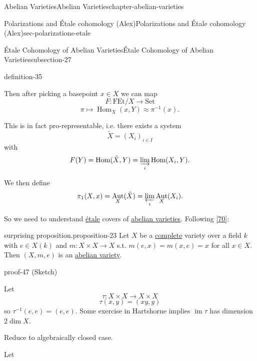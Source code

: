 \documentclass[oneside,10pt,]{book}
\numberwithin{equation}{section}
\DeclareMathOperator{\Hom}{Hom}
\DeclareMathOperator{\im}{im}
\DeclareMathOperator{\Aut}{Aut}
\begin{document}
\begin{chapterptx}{Abelian Varieties}{}{Abelian Varieties}{}{}{chapter-abelian-varieties}
\begin{sectionptx}{Polarizations and Étale cohomology (Alex)}{}{Polarizations and Étale cohomology (Alex)}{}{}{sec-polarizations-etale}
\begin{subsectionptx}{Étale Cohomology of Abelian Varieties}{}{Étale Cohomology of Abelian Varieties}{}{}{subsection-27}
\begin{definition}{}{definition-35}
\par
\hypertarget{p-280}{}%
Then after picking a basepoint \(x\in X\) we can map%
\begin{equation*}
F\colon \mathrm{FEt}/X\to \mathrm{Set}
\end{equation*}
%
\begin{equation*}
\pi\mapsto \Hom_X(x,Y) \approx\pi^{-1}(x)\text{.}
\end{equation*}
%
\par
\hypertarget{p-281}{}%
This is in fact pro-representable, i.e. there exists a system%
\begin{equation*}
\tilde X = (X_i)_{i\in I}
\end{equation*}
with%
\begin{equation*}
F(Y) = \Hom(\tilde X ,Y) = \varinjlim_i \Hom(X_i, Y)\text{.}
\end{equation*}
%
\par
\hypertarget{p-282}{}%
We then define%
\begin{equation*}
\pi_1(X,x) = \Aut_X(\tilde X) = \varprojlim_i \Aut_X(X_i)\text{.}
\end{equation*}
%
\end{definition}
\hypertarget{p-283}{}%
So we need to understand \hyperref[def-etale]{étale} covers of \hyperref[def-buntes-abvar]{abelian varieties}. Following \hyperlink{bib-vandergeer-moonen}{[70]}:%
\begin{proposition}{surprising proposition.}{}{proposition-23}%
\hypertarget{p-284}{}%
Let \(X\)  be a \hyperref[def-abelian-complete-var]{complete} variety over a field \(k\) with \(e\in X(k)\) and \(m \colon X\times X\to X\) s.t. \(m(e,x) = m(x,e) = x\) for all \(x \in X\). Then \((X, m,e)\) is an \hyperref[def-buntes-abvar]{abelian variety}.%
\end{proposition}
\begin{proofptx}{}{proof-47}
\hypertarget{p-285}{}%
(Sketch)%
\par
\hypertarget{p-286}{}%
Let%
\begin{equation*}
\tau\colon X\times X \to X\times X
\end{equation*}
%
\begin{equation*}
\tau(x,y) = (xy,y)
\end{equation*}
so \(\tau^{-1} (e,e) = (e,e)\). Some exercise in Hartshorne implies \(\im \tau\) has dimension \(2\dim X\).%
\par
\hypertarget{p-287}{}%
Reduce to algebraically closed case.%
\par
\hypertarget{p-288}{}%
Let%
\begin{equation*}

\end{equation*}
\end{proofptx}
\end{subsectionptx}
\end{sectionptx}
\end{chapterptx}
\end{document}
